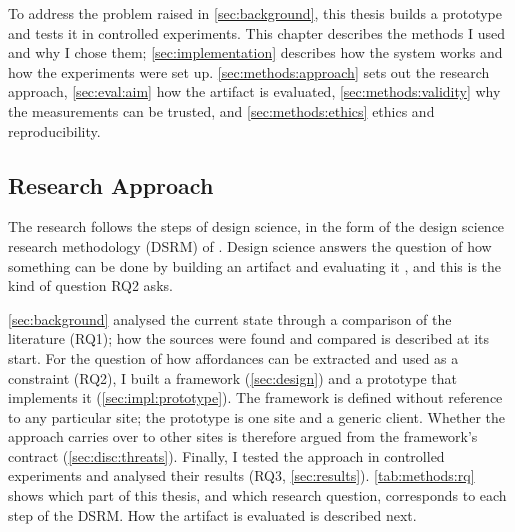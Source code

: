 To address the problem raised in \autoref{sec:background}, this thesis builds a prototype and tests it in controlled experiments.
This chapter describes the methods I used and why I chose them; \autoref{sec:implementation} describes how the system works and how the experiments were set up.
\autoref{sec:methods:approach} sets out the research approach, \autoref{sec:eval:aim} how the artifact is evaluated, \autoref{sec:methods:validity} why the measurements can be trusted, and \autoref{sec:methods:ethics} ethics and reproducibility.

\subsection{Research Approach}\label{sec:methods:approach}\label{sec:methods:procedure}\label{sec:methods:design}

The research follows the steps of design science, in the form of the design science research methodology (DSRM) of \citet{peffers2007design}.
Design science answers the question of how something can be done by building an artifact and evaluating it \cite{hevner2004design}, and this is the kind of question RQ2 asks.

\autoref{sec:background} analysed the current state through a comparison of the literature (RQ1); how the sources were found and compared is described at its start.
For the question of how affordances can be extracted and used as a constraint (RQ2), I built a framework (\autoref{sec:design}) and a prototype that implements it (\autoref{sec:impl:prototype}).
The framework is defined without reference to any particular site; the prototype is one site and a generic client.
Whether the approach carries over to other sites is therefore argued from the framework's contract (\autoref{sec:disc:threats}).
Finally, I tested the approach in controlled experiments and analysed their results (RQ3, \autoref{sec:results}).
\autoref{tab:methods:rq} shows which part of this thesis, and which research question, corresponds to each step of the DSRM.
How the artifact is evaluated is described next.

